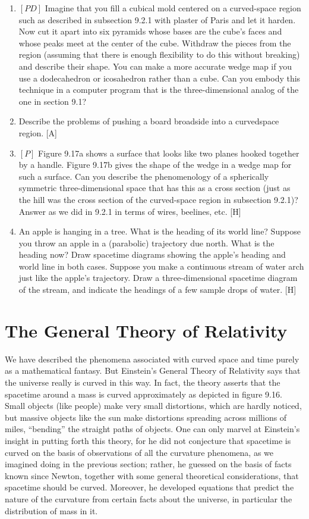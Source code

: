\documentclass{book}
\begin{document}
\begin{enumerate}
\item $[PD]$ Imagine that you fill a cubical mold centered on a curved-space
region such as described in subsection 9.2.1 with plaster of Paris and let
it harden. Now cut it apart into six pyramids whose bases are the cube's
faces and whose peaks meet at the center of the cube. Withdraw the
pieces from the region (assuming that there is enough flexibility to do
this without breaking) and describe their shape. You can make a more
accurate wedge map if you use a dodecahedron or icosahedron rather
than a cube. Can you embody this technique in a computer program
that is the three-dimensional analog of the one in section 9.1?

\item Describe the problems of pushing a board broadside into a curvedspace region. [A]

\item $[P]$ Figure 9.17a shows a surface that looks like two planes hooked
together by a handle. Figure 9.17b gives the shape of the wedge in a
wedge map for such a surface. Can you describe the phenomenology
of a spherically symmetric three-dimensional space that has this as a
cross section (just as the hill was the cross section of the curved-space
region in subsection 9.2.1)? Answer as we did in 9.2.1 in terms of wires,
beelines, etc. [H]

\item An apple is hanging in a tree. What is the heading of its world
line? Suppose you throw an apple in a (parabolic) trajectory due north.
What is the heading now? Draw spacetime diagrams showing the apple's
heading and world line in both cases. Suppose you make a continuous
stream of water arch just like the apple's trajectory. Draw a three-dimensional spacetime diagram of the stream, and indicate the headings
of a few sample drops of water. [H]
\end{enumerate}
\section{The General Theory of Relativity}

We have described the phenomena associated with curved space and
time purely as a mathematical fantasy. But Einstein's General Theory
of Relativity says that the universe really is curved in this way. In
fact, the theory asserts that the spacetime around a mass is curved approximately as depicted in figure 9.16. Small objects (like people) make
very small distortions, which are hardly noticed, but massive objects like
the sun make distortions spreading across millions of miles, ``bending''
the straight paths of objects. One can only marvel at Einstein's insight
in putting forth this theory, for he did not conjecture that spacetime
is curved on the basis of observations of all the curvature phenomena,
as we imagined doing in the previous section; rather, he guessed on the
basis of facts known since Newton, together with some general theoretical considerations, that spacetime should be curved. Moreover, he developed equations that predict the nature of the curvature from certain
facts about the universe, in particular the distribution of mass in it.
\end{document}
